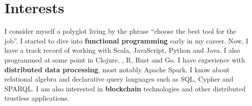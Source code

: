 \documentclass[letterpaper]{cv} %
\begin{document}







\makeprofile %


\section{Interests}

I consider myself a polyglot living by the phrase
``choose the best tool for the job''. I started to dive into \textbf{functional programming} early in my career.
Now, I have a track record of working with Scala, JavaScript, Python and Java. I also programmed at
some point in Clojure, \cpp{}, R, Rust and Go. I have experience with \textbf{distributed data processing},
most notably Apache Spark. I know about relational algebra and declarative query languages
such as SQL, Cypher and SPARQL. I am also interested in \textbf{blockchain} technologies
and other distributed trustless applications.
\end{document}
